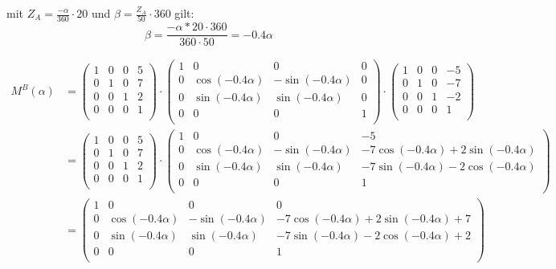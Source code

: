 \documentclass[a4paper,10pt,DIV=14]{scrartcl}
\begin{document}
mit $Z_A = \frac{-\alpha}{360} \cdot 20$ und $\beta = \frac{Z_A}{50} \cdot 360$ gilt:
$$ \beta = \frac{- \alpha * 20 \cdot 360}{360 \cdot 50} = -0.4 \alpha$$

\begin{align*}
	M^B(\alpha) & = \begin{pmatrix}
						1 & 0 & 0 & 5 \\
						0 & 1 & 0 & 7 \\
						0 & 0 & 1 & 2 \\
						0 & 0 & 0 & 1 \\
					\end{pmatrix} \cdot
					\begin{pmatrix}
						1 & 0                & 0                 & 0 \\
						0 & \cos(-0.4\alpha) & -\sin(-0.4\alpha) & 0 \\
						0 & \sin(-0.4\alpha) & \sin(-0.4\alpha)  & 0 \\
						0 & 0                & 0                 & 1 \\
					\end{pmatrix} \cdot
					\begin{pmatrix}
						1 & 0 & 0 & -5 \\
						0 & 1 & 0 & -7 \\
						0 & 0 & 1 & -2 \\
						0 & 0 & 0 & 1  \\
					\end{pmatrix} \\
				& = \begin{pmatrix}
						1 & 0 & 0 & 5 \\
						0 & 1 & 0 & 7 \\
						0 & 0 & 1 & 2 \\
						0 & 0 & 0 & 1 \\
					\end{pmatrix} \cdot
					\begin{pmatrix}
						1 & 0                & 0                 & -5                                     \\
						0 & \cos(-0.4\alpha) & -\sin(-0.4\alpha) & -7\cos(-0.4\alpha) + 2\sin(-0.4\alpha) \\
						0 & \sin(-0.4\alpha) & \sin(-0.4\alpha)  & -7\sin(-0.4\alpha) - 2\cos(-0.4\alpha) \\
						0 & 0                & 0                 & 1                                      \\
					\end{pmatrix} \\
				& = \begin{pmatrix}
						1 & 0                & 0                 & 0                                          \\
						0 & \cos(-0.4\alpha) & -\sin(-0.4\alpha) & -7\cos(-0.4\alpha) + 2\sin(-0.4\alpha) + 7 \\
						0 & \sin(-0.4\alpha) & \sin(-0.4\alpha)  & -7\sin(-0.4\alpha) - 2\cos(-0.4\alpha) + 2 \\
						0 & 0                & 0                 & 1                                          \\
					\end{pmatrix}
\end{align*}
\end{document}
